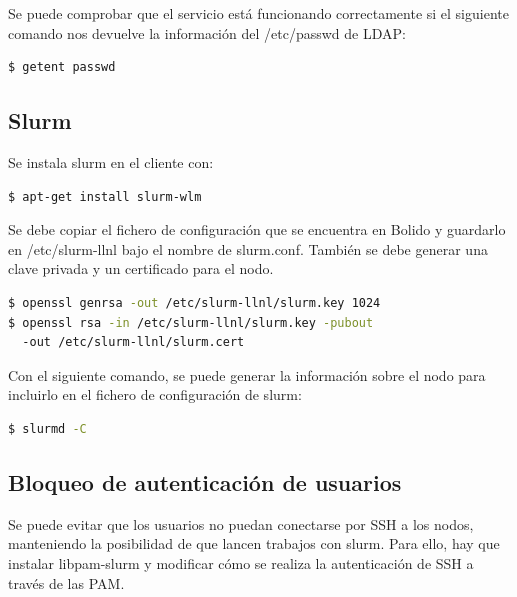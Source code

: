 \vspace{2mm}
Se puede comprobar que el servicio está funcionando correctamente si el siguiente comando nos devuelve la información del /etc/passwd de LDAP:
\vspace{2mm}
\begin{lstlisting}[language=bash]
    $ getent passwd
\end{lstlisting}

\subsection{Slurm}

Se instala slurm en el cliente con:

\begin{lstlisting}[language=bash]
    $ apt-get install slurm-wlm
\end{lstlisting}
\vspace{2mm}

Se debe copiar el fichero de configuración que se encuentra en Bolido y guardarlo en /etc/slurm-llnl bajo el nombre de slurm.conf. También se debe generar una clave privada y un certificado para el nodo.
\vspace{4mm}

\begin{lstlisting}[language=bash]
$ openssl genrsa -out /etc/slurm-llnl/slurm.key 1024
$ openssl rsa -in /etc/slurm-llnl/slurm.key -pubout 
  -out /etc/slurm-llnl/slurm.cert
\end{lstlisting}
\vspace{4mm}

Con el siguiente comando, se puede generar la información sobre el nodo para incluirlo en el fichero de configuración de slurm:

\vspace{2mm}
\begin{lstlisting}[language=bash]
    $ slurmd -C
\end{lstlisting}

\subsection{Bloqueo de autenticación de usuarios}
\vspace{2mm}

Se puede evitar que los usuarios no puedan conectarse por SSH a los nodos, manteniendo la posibilidad de que lancen trabajos con slurm. Para ello, hay que instalar libpam-slurm y modificar cómo se realiza la autenticación de SSH a través de las PAM.


